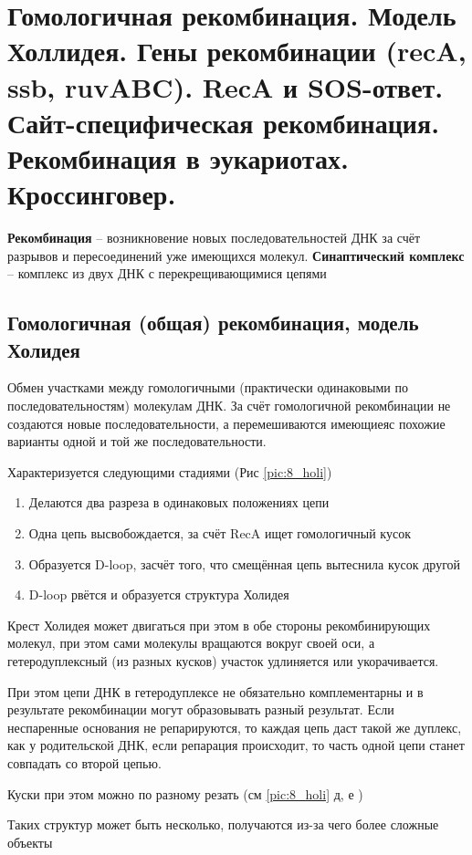 	\section{Гомологичная рекомбинация. Модель Холлидея.
		Гены рекомбинации (recA, ssb, ruvABC). RecA и SOS-ответ.
		Сайт-специфическая рекомбинация. 
		Рекомбинация в эукариотах. Кроссинговер.}
	
\textbf{Рекомбинация} -- возникновение новых последовательностей ДНК за счёт разрывов и пересоединений уже имеющихся молекул.
\textbf{Синаптический комплекс} -- комплекс из двух ДНК с перекрещивающимися цепями
\subsection{Гомологичная (общая) рекомбинация, модель Холидея}
Обмен участками между гомологичными (практически одинаковыми по последовательностям)  молекулам ДНК. За счёт гомологичной рекомбинации не создаются новые последовательности, а перемешиваются имеющиеяс похожие варианты одной и той же последовательности.

Характеризуется следующими стадиями (Рис \ref{pic:8_holi})
\begin{enumerate}
\item Делаются два разреза в одинаковых положениях цепи
\item Одна цепь высвобождается, за счёт RecA ищет гомологичный кусок 
\item Образуется D-loop, засчёт того, что смещённая цепь вытеснила кусок другой
\item D-loop рвётся и образуется структура Холидея
\end{enumerate}
  
 Крест Холидея может двигаться при этом в обе стороны рекомбинирующих молекул, при этом сами молекулы вращаются вокруг своей оси, а гетеродуплексный (из разных кусков) участок удлиняется или укорачивается. 
 
 При этом цепи ДНК в гетеродуплексе не обязательно комплементарны и в результате рекомбинации могут образовывать разный результат. Если неспаренные основания не репарируются, то каждая цепь даст такой же дуплекс, как у родительской ДНК, если репарация происходит, то часть одной цепи станет совпадать со второй цепью.
 
 Куски при этом можно по разному резать (см \ref{pic:8_holi} д, е )
 
 Таких структур может быть несколько, получаются из-за чего более сложные объекты
 \begin{figure}[H]
 \end{figure}
 	
